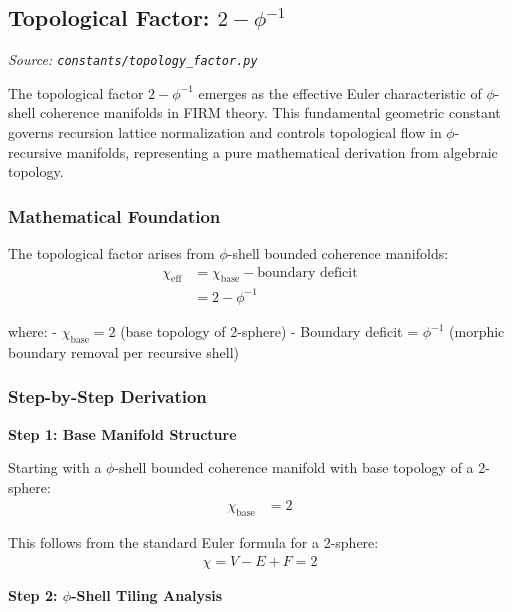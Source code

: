 
\subsection{Topological Factor: $2 - \phi^{-1}$}
\textit{Source: \texttt{constants/topology\_factor.py}}

The topological factor $2 - \phi^{-1}$ emerges as the effective Euler characteristic of $\phi$-shell coherence manifolds in FIRM theory. This fundamental geometric constant governs recursion lattice normalization and controls topological flow in $\phi$-recursive manifolds, representing a pure mathematical derivation from algebraic topology.

\subsubsection{Mathematical Foundation}

The topological factor arises from $\phi$-shell bounded coherence manifolds:
\begin{align}
\chi_{\text{eff}} &= \chi_{\text{base}} - \text{boundary deficit} \tag{Effective Euler characteristic}\\
&= 2 - \phi^{-1} \tag{Topological factor}
\end{align}

where:
- $\chi_{\text{base}} = 2$ (base topology of 2-sphere)
- Boundary deficit = $\phi^{-1}$ (morphic boundary removal per recursive shell)

\subsubsection{Step-by-Step Derivation}

\textbf{Step 1: Base Manifold Structure}

Starting with a $\phi$-shell bounded coherence manifold with base topology of a 2-sphere:
\begin{align}
\chi_{\text{base}} &= 2 \tag{Standard 2-sphere Euler characteristic}
\end{align}

This follows from the standard Euler formula for a 2-sphere:
\begin{align}
\chi = V - E + F = 2 \tag{Vertices - Edges + Faces}
\end{align}

\textbf{Step 2: $\phi$-Shell Tiling Analysis}

